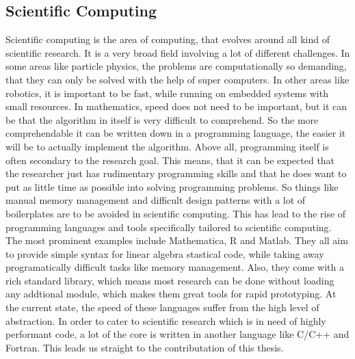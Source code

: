 \subsection{Scientific Computing}
Scientific computing is the area of computing, that evolves around all kind of scientific research.
It is a very broad field involving a lot of different challenges. In some areas like particle physics, the problems are computationally so demanding, that they can only be solved with the help of super computers. In other areas like robotics, it is important to be fast, while running on embedded systems with small resources. In mathematics, speed does not need to be important, but it can be that the algorithm in itself is very difficult to comprehend. So the more comprehendable it can be written down in a programming language, the easier it will be to actually implement the algorithm.
Above all, programming itself is often secondary to the research goal.
This means, that it can be expected that the researcher just has rudimentary programming skills and that he does want to put as little time as possible into solving programming problems.
So things like manual memory management and difficult design patterns with a lot of boilerplates are to be avoided in scientific computing.
This has lead to the rise of programming languages and tools specifically tailored to scientific computing.
The most prominent examples include Mathematica, R and Matlab. 
They all aim to provide simple syntax for linear algebra stastical code, while taking away programatically difficult tasks like memory management. Also, they come with a rich standard library, which means most research can be done without loading any addtional module, which makes them great tools for rapid prototyping.
At the current state, the speed of these languages suffer from the high level of abstraction. In order to cater to scientific research which is in need of highly performant code, a lot of the core is written in another language like C/C++ and Fortran.
This leads us straight to the contributation of this thesis.

